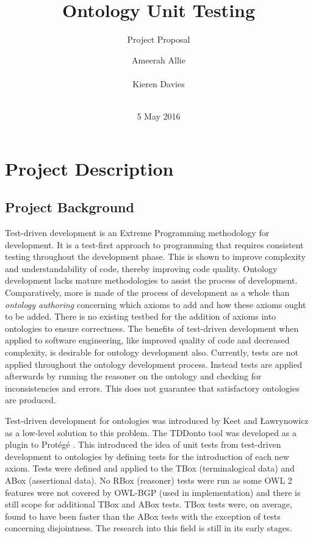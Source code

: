 \documentclass[draft]{sig-alternate}
\begin{document}
\title{Ontology Unit Testing}
\subtitle{Project Proposal}
\author{
  \alignauthor
  Ameerah Allie\\
    \\
  \alignauthor
  Kieren Davies\\
   \\
}
\date{5 May 2016}
\maketitle

\section{Project Description}

\subsection{Project Background}

Test-driven development is an Extreme Programming methodology for development. It is a test-first approach to programming that requires consistent testing throughout the development phase. This is shown to improve complexity and understandability of code, thereby improving code quality. Ontology development lacks mature methodologies to assist the process of development. Comparatively, more is made of the process of development as a whole than \textit{ontology authoring} concerning which axioms to add and how these axioms ought to be added. There is no existing testbed for the addition of axioms into ontologies to ensure correctness. The benefits of test-driven development when applied to software engineering, like improved quality of code and decreased complexity, is desirable for ontology development also. Currently, tests are not applied throughout the ontology development process. Instead tests are applied afterwards by running the reasoner on the ontology and checking for inconsistencies and errors. This does not guarantee that satisfactory ontologies are produced.

Test-driven development for ontologies was introduced by Keet and {\L}awrynowicz \cite{DBLP:journals/corr/KeetL15} as a low-level solution to this problem. The TDDonto tool was developed as a plugin to Prot\'eg\'e \cite{DBLP:conf/dlog/LawrynowiczK16}. This introduced the idea of unit tests from test-driven development to ontologies by defining tests for the introduction of each new axiom. Tests were defined and applied to the TBox (terminalogical data) and ABox (assertional data). No RBox (reasoner) tests were run as some OWL 2 features were not covered by OWL-BGP (used in implementation) and there is still scope for additional TBox and ABox tests. TBox tests were, on average, found to have been faster than the ABox tests with the exception of tests concerning disjointness. The research into this field is still in its early stages.
\end{document}
